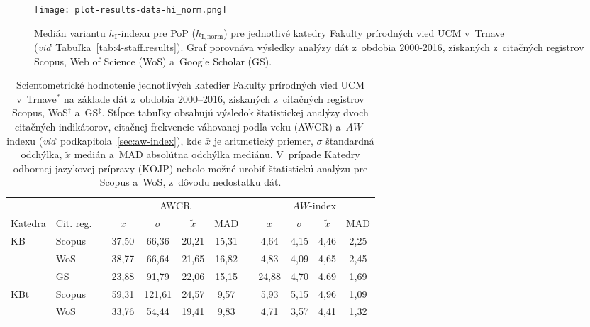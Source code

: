 \begin{figure}
  \centering
  \texttt{[image: plot-results-data-hi\_norm.png]}
  \caption[Medián $h_{\mathrm{I,norm}}$ pre jednotlivé katedry FPV]%
  {Medián variantu $h_{\mathrm{I}}$-indexu pre PoP ($h_{\mathrm{I,norm}}$) pre
    jednotlivé katedry Fakulty prírodných vied UCM v~Trnave
    (\emph{viď}~Tabuľka~\ref{tab:4-staff.results}).  Graf porovnáva výsledky
    analýzy dát z~obdobia 2000-2016, získaných z~citačných registrov Scopus, Web
    of Science (WoS) a~Google Scholar (GS).}
  \label{fig:hinorm.plot}
\end{figure}

\begin{table}
  \centering\small
  \caption[Hodnotenie FPV -- AWCR a~$AW$-index]%
  {Scientometrické hodnotenie jednotlivých katedier Fakulty prírodných vied UCM
    v~Trnave$^\ast$ na základe dát z~obdobia 2000--2016, získaných z~citačných
    registrov Scopus, WoS$^\dagger$ a~GS$^\ddagger$.  Stĺpce tabuľky obsahujú
    výsledok štatistickej analýzy dvoch citačných indikátorov, citačnej
    frekvencie váhovanej podľa veku (AWCR) a~$AW$-indexu
    (\emph{viď}~podkapitola~\ref{sec:aw-index}), kde $\bar{x}$ je aritmetický
    priemer, $\sigma$ štandardná odchýlka, $\tilde{x}$ medián a~MAD absolútna
    odchýlka mediánu.  V~prípade Katedry odbornej jazykovej prípravy (KOJP)
    nebolo možné urobiť štatistickú analýzu pre Scopus a~WoS, z~dôvodu
    nedostatku dát.}
  \label{tab:5-staff.results}
  \begin{tabularx}{\textwidth}{XXp{0.2ex}ccccp{0.2ex}cccc}
    \toprule
    & & & \multicolumn{4}{c}{AWCR} & & \multicolumn{4}{c}{$AW$-index} \\
    \cmidrule{4-7}\cmidrule{9-12}
    Katedra & Cit. reg. & & $\bar{x}$ & $\sigma$ & $\tilde{x}$ & MAD & & $\bar{x}$ & $\sigma$ & $\tilde{x}$ & MAD \\[0.3ex]
    \midrule
    KB   & Scopus & & 37,50  & 66,36  & 20,21  & 15,31  & & 4,64  & 4,15 & 4,46  & 2,25 \\
         & WoS    & & 38,77  & 66,64  & 21,65  & 16,82  & & 4,83  & 4,09 & 4,65  & 2,45 \\
         & GS     & & 23,88  & 91,79  & 22,06  & 15,15  & & 24,88 & 4,70 & 4,69  & 1,69 \\[1ex]
    KBt  & Scopus & & 59,31  & 121,61 & 24,57  & 9,57   & & 5,93  & 5,15 & 4,96  & 1,09 \\
         & WoS    & & 33,76  & 54,44  & 19,41  & 9,83   & & 4,71  & 3,57 & 4,41  & 1,32 \\

\end{tabularx}
\end{table}
